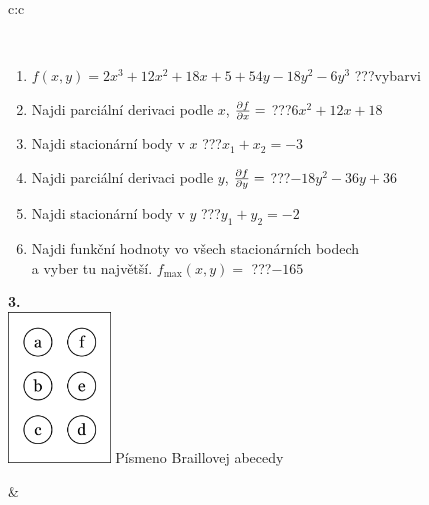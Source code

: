 \documentclass[10pt]{report}
\begin{document}
\begin{tabular}{c:c}
\begin{minipage}[c][104.5mm][t]{0.5\linewidth}
\begin{center}
\begin{minipage}{0.95\linewidth}
\begin{center}
\end{center}
\end{minipage}
\\[1mm]
\begin{minipage}{0.79\linewidth}
\begin{center}
\begin{varwidth}{\linewidth}
\begin{enumerate}
\normalsize
\item $f(x,y)=2x^3+12x^2+18x+5+54y-18y^2-6y^3$\quad \dotfill\; ???\;\dotfill \quad vybarvi
\item Najdi parciální derivaci podle $x$, $\pdv{f}{x}=$\quad \dotfill\; ???\;\dotfill \quad $6x^2+12x+18$
\item Najdi stacionární body v $x$\quad \dotfill\; ???\;\dotfill \quad $x_1+x_2=-3$
\item Najdi parciální derivaci podle $y$, $\pdv{f}{y}=$\quad \dotfill\; ???\;\dotfill \quad $-18y^2-36y+36$
\item Najdi stacionární body v $y$\quad \dotfill\; ???\;\dotfill \quad $y_1+y_2=-2$
\item Najdi funkční hodnoty vo všech stacionárních bodech \\ \phantom{xxxxxx} a vyber tu najvětší. $f_{\text{max}}(x,y)=$\quad \dotfill\; ???\;\dotfill \quad $-165$
\end{enumerate}
\end{varwidth}
\end{center}
\end{minipage}
\begin{minipage}{0.20\linewidth}
\begin{center}
{\Huge\bfseries 3.} \\[2mm]
\includegraphics[height=40mm]{../images/braille.png}
{\small Písmeno Braillovej abecedy}
\end{center}
\end{minipage}
\end{center}
\end{minipage}
&
\begin{minipage}[c][104.5mm][t]{0.5\linewidth}
\begin{center}

\end{center}
\end{minipage}
\end{tabular}
\end{document}
